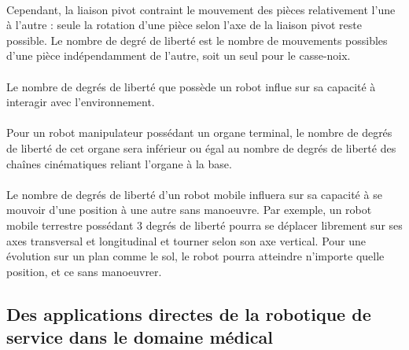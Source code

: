 \documentclass[a4paper,10pt]{article}
\begin{document}
            \paragraph{}
                Cependant, la liaison pivot contraint le mouvement
                des pièces relativement l'une à l'autre : seule la rotation d'une pièce selon
                l'axe de la liaison pivot reste possible. Le nombre de degré de liberté 
                est le nombre de mouvements possibles d'une pièce indépendamment de l'autre, 
                soit un seul pour le casse-noix.
                
            \paragraph{}
                Le nombre de degrés de liberté que possède un robot influe sur sa capacité à 
                interagir avec l'environnement. 
                
            \paragraph{}
                Pour un robot manipulateur possédant un organe terminal, le nombre de 
                degrés de liberté de cet organe sera inférieur ou égal au nombre de degrés de liberté 
                des chaînes cinématiques reliant l'organe à la base. 
                
            \paragraph{}
                Le nombre de degrés de liberté d'un robot mobile influera sur sa 
                capacité à se mouvoir d'une position à une autre sans manoeuvre. 
                Par exemple, un robot mobile terrestre possédant 3 degrés de liberté 
                pourra se déplacer librement sur ses axes transversal et longitudinal 
                et tourner selon son axe vertical. Pour une évolution sur un plan comme
                le sol, le robot pourra atteindre n'importe quelle position, et ce sans manoeuvrer.  
                
        
        

        \subsection{Des applications directes de la robotique de service dans le domaine médical} 
\end{document}
